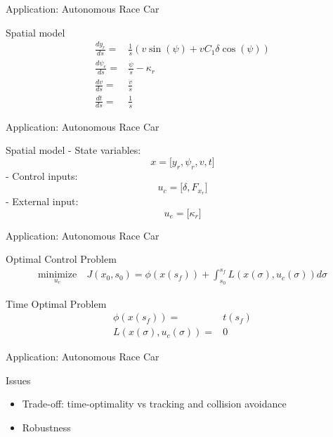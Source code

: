 \documentclass[]{beamer}
\begin{document}
\begin{frame}{Application: Autonomous Race Car}

\begin{block}{Spatial model}
\begin{align*}
\frac{dy_r}{ds}=&\frac{1}{\dot s} (v\sin(\psi)+vC_1\delta\cos(\psi))\\
\frac{d\psi_e}{ds}=&\frac{\dot \psi}{\dot s}-\kappa_r\\
\frac{dv}{ds}=&\frac{\dot v}{\dot s}\\
\frac{dt}{ds}=&\frac{1}{\dot s}
\end{align*}
\end{block}

\end{frame}

\begin{frame}{Application: Autonomous Race Car}

\begin{block}{Spatial model}
- State variables: \[x=\big[y_r,\psi_r,v,t\big]\]
- Control inputs: \[u_c=\big[\delta, F_{x_r}\big]\]
- External input: \[u_e=\big[\kappa_r\big]\]
\end{block}

\end{frame}

\begin{frame}{Application: Autonomous Race Car}

\begin{block}{Optimal Control Problem}
\begin{align*}
\underset{u_c}{\text{minimize}}\ & J(x_0,s_0)=\phi(x(s_f))+\int_{s_0}^{s_f}L(x(\sigma),u_c(\sigma))d\sigma
\end{align*}
\end{block}

\begin{block}{Time Optimal Problem}
\begin{align*}
\phi(x(s_f)) =& t(s_f)\\
L(x(\sigma),u_c(\sigma)) =& 0
\end{align*}
\end{block}

\end{frame}

\begin{frame}{Application: Autonomous Race Car}

\begin{block}{Issues}
\begin{itemize}
\item Trade-off: time-optimality vs tracking and collision avoidance
\item Robustness
\end{itemize}
\end{block}

\end{frame}
\end{document}
